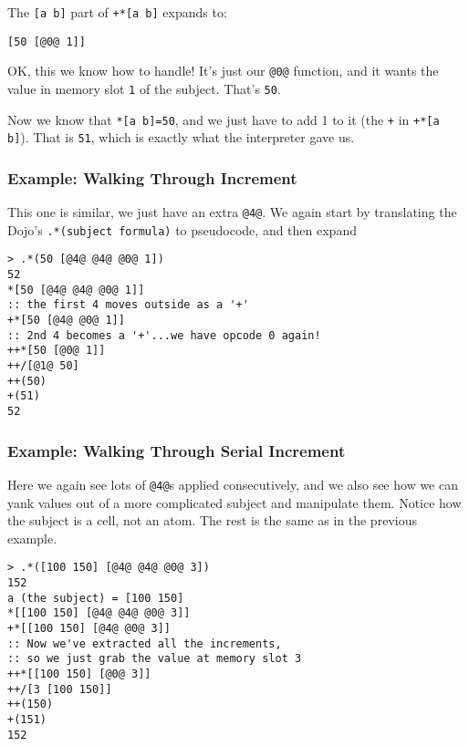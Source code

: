 \documentclass[twoside]{article}
\begin{document}
\noindent
The \lstinline[style=inlinecode]{[a b]} part of \lstinline[style=inlinecode]{+*[a b]} expands to:

\begin{lstlisting}[style=listingcode]
[50 [@0@ 1]]
\end{lstlisting}

\noindent
OK, this we know how to handle! It's just our \lstinline[style=inlinecode]{@0@} function, and it wants the value in memory slot \lstinline[style=inlinecode]{1} of the subject. That's \lstinline[style=inlinecode]{50}.

Now we know that \lstinline[style=inlinecode]{*[a b]=50}, and we just have to add 1 to it (the \lstinline[style=inlinecode]{+} in \lstinline[style=inlinecode]{+*[a b]}). That is \lstinline[style=inlinecode]{51}, which is exactly what the interpreter gave us.

\subsubsection{Example:  Walking Through Increment}

This one is similar, we just have an extra \lstinline[style=inlinecode]{@4@}. We again start by translating the Dojo's \lstinline[style=inlinecode]{.*(subject formula)} to pseudocode, and then expand

\begin{lstlisting}[style=listingcode]
> .*(50 [@4@ @4@ @0@ 1])
52
*[50 [@4@ @4@ @0@ 1]]
:: the first 4 moves outside as a '+'
+*[50 [@4@ @0@ 1]]
:: 2nd 4 becomes a '+'...we have opcode 0 again!
++*[50 [@0@ 1]]
++/[@1@ 50]
++(50)
+(51)
52
\end{lstlisting}
  
\subsubsection{Example:  Walking Through Serial Increment}

Here we again see lots of \lstinline[style=inlinecode]{@4@}s applied consecutively, and we also see how we can yank values out of a more complicated subject and manipulate them. Notice how the subject is a cell, not an atom. The rest is the same as in the previous example.

\begin{lstlisting}[style=listingcode]
> .*([100 150] [@4@ @4@ @0@ 3])
152
a (the subject) = [100 150]
*[[100 150] [@4@ @4@ @0@ 3]]
+*[[100 150] [@4@ @0@ 3]]
:: Now we've extracted all the increments,
:: so we just grab the value at memory slot 3
++*[[100 150] [@0@ 3]]
++/[3 [100 150]]
++(150)
+(151)
152
\end{lstlisting}
\end{document}
